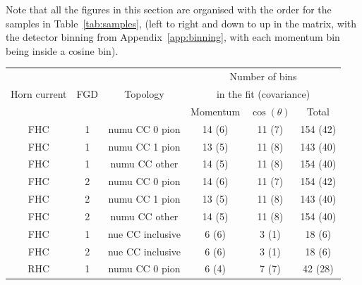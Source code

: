 Note that all the figures in this section are organised with the order
for the samples in Table~\ref{tab:samples}, (left to right and down to
up in the matrix, with the detector binning from
Appendix~\ref{app:binning}, with each momentum bin being inside a
cosine bin).

\begin{table}
  \begin{adjustbox}{center}
    \begin{tabular}{cccccc}
      \toprule
      \multirow{3}{*}{Horn current} & \multirow{3}{*}{\Gls{FGD}} & \multirow{3}{*}{Topology}     & \multicolumn{3}{c}{Number of bins}           \\
                                    &                            &                               & \multicolumn{3}{c}{in the fit (covariance)}  \\
                                    &                            &                               & Momentum & $\cos(\theta)$ & Total            \\
      \midrule
      \Gls{FHC}                     & 1                          & \Gls{numu} \Gls{CC} 0 pion    & 14 (6)    & 11  (7)       & 154 (42)         \\ 
      \Gls{FHC}                     & 1                          & \Gls{numu} \Gls{CC} 1 pion    & 13 (5)    & 11  (8)       & 143 (40)         \\ 
      \Gls{FHC}                     & 1                          & \Gls{numu} \Gls{CC} other     & 14 (5)    & 11  (8)       & 154 (40)         \\ 
      \Gls{FHC}                     & 2                          & \Gls{numu} \Gls{CC} 0 pion    & 14 (6)    & 11  (7)       & 154 (42)         \\ 
      \Gls{FHC}                     & 2                          & \Gls{numu} \Gls{CC} 1 pion    & 13 (5)    & 11  (8)       & 143 (40)         \\ 
      \Gls{FHC}                     & 2                          & \Gls{numu} \Gls{CC} other     & 14 (5)    & 11  (8)       & 154 (40)         \\ 
      \Gls{FHC}                     & 1                          & \Gls{nue} \Gls{CC} inclusive  &  6 (6)    &  3  (1)       &  18  (6)         \\ 
      \Gls{FHC}                     & 2                          & \Gls{nue} \Gls{CC} inclusive  &  6 (6)    &  3  (1)       &  18  (6)         \\ 
      \Gls{RHC}                     & 1                          & \Gls{numu} \Gls{CC} 0 pion    &  6 (4)    &  7  (7)       &  42 (28)         \\ 

\end{tabular}
\end{adjustbox}
\end{table}

